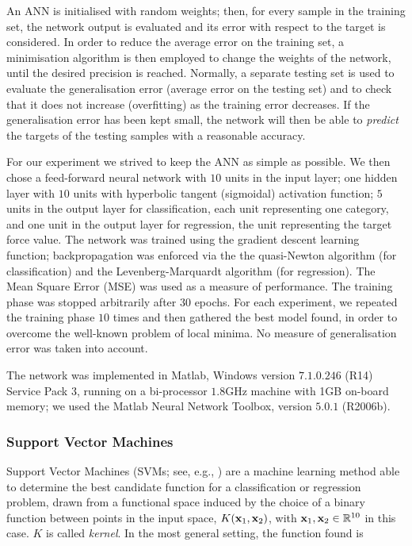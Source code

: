 An ANN is initialised with random weights; then, for every sample in
the training set, the network output is evaluated and its error with
respect to the target is considered. In order to reduce the average
error on the training set, a minimisation algorithm is then employed
to change the weights of the network, until the desired precision is
reached. Normally, a separate testing set is used to evaluate the
generalisation error (average error on the testing set) and to check
that it does not increase (overfitting) as the training error
decreases. If the generalisation error has been kept small, the
network will then be able to \emph{predict} the targets of the testing
samples with a reasonable accuracy.

For our experiment we strived to keep the ANN as simple as possible.
We then chose a feed-forward neural network with $10$ units in the
input layer; one hidden layer with $10$ units with hyperbolic tangent
(sigmoidal) activation function; $5$ units in the output layer for
classification, each unit representing one category, and one unit in
the output layer for regression, the unit representing the target
force value. The network was trained using the gradient descent
learning function; backpropagation was enforced via the the
quasi-Newton algorithm (for classification) and the
Levenberg-Marquardt algorithm (for regression). The Mean Square Error
(MSE) was used as a measure of performance. The training phase was
stopped arbitrarily after $30$ epochs. For each experiment, we
repeated the training phase $10$ times and then gathered the best
model found, in order to overcome the well-known problem of local
minima. No measure of generalisation error was taken into account.

The network was implemented in Matlab, Windows version $7.1.0.246$
(R14) Service Pack 3, running on a bi-processor $1.8$GHz machine with
1GB on-board memory; we used the Matlab Neural Network Toolbox,
version $5.0.1$ (R2006b).

\subsubsection{Support Vector Machines}

Support Vector Machines (SVMs; see, e.g.,
\cite{BGV92,Burges98,Cristianini00}) are a machine learning method
able to determine the best candidate function for a classification or
regression problem, drawn from a functional space induced by the
choice of a binary function between points in the input space,
$K(\mathbf{x}_1,\mathbf{x}_2)$, with $\mathbf{x}_1, \mathbf{x}_2 \in \mathbb{R}^{10}$ in this case. $K$
is called \emph{kernel}. In the most general setting, the function
found is

